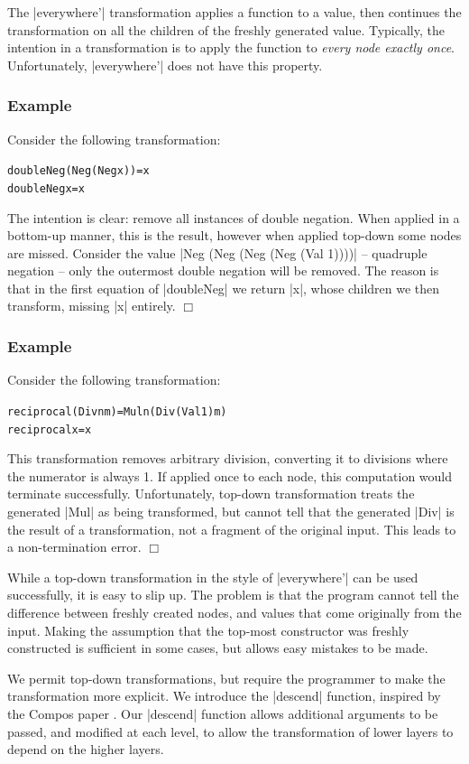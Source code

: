 \documentclass[preprint]{sigplanconf}
\let\cite=\citep
\newcounter{exmp}
\newcommand{\yesexample}{\subsubsection*{Example \arabic{exmp}}\refstepcounter{exmp}}
\newcommand{\noexample}{\hfill$\Box$}
\newenvironment{code}{\begin{alltt}\small}{\end{alltt}}
\newenvironment{example}{\yesexample}{\noexample}
\begin{document}
The |everywhere'| transformation applies a function to a value, then continues the transformation on all the children of the freshly generated value. Typically, the intention in a transformation is to apply the function to \textit{every node exactly once}. Unfortunately, |everywhere'| does not have this property.

\begin{example}
Consider the following transformation:

\begin{code}
doubleNeg (Neg (Neg x))  = x
doubleNeg x              = x
\end{code}

The intention is clear: remove all instances of double negation. When applied in a bottom-up manner, this is the result, however when applied top-down some nodes are missed. Consider the value |Neg (Neg (Neg (Neg (Val 1))))| -- quadruple negation -- only the outermost double negation will be removed. The reason is that in the first equation of |doubleNeg| we return |x|, whose children we then transform, missing |x| entirely.
\end{example}

\begin{example}
Consider the following transformation:

\begin{code}
reciprocal (Div n m)  = Mul n (Div (Val 1) m)
reciprocal x          = x
\end{code}

This transformation removes arbitrary division, converting it to divisions where the numerator is always 1. If applied once to each node, this computation would terminate successfully. Unfortunately, top-down transformation treats the generated |Mul| as  being transformed, but cannot tell that the generated |Div| is the result of a transformation, not a fragment of the original input. This leads to a non-termination error.
\end{example}

While a top-down transformation in the style of |everywhere'| can be used successfully, it is easy to slip up. The problem is that the program cannot tell the difference between freshly created nodes, and values that come originally from the input. Making the assumption that the top-most constructor was freshly constructed is sufficient in some cases, but allows easy mistakes to be made.

We permit top-down transformations, but require the programmer to make the transformation more explicit. We introduce the |descend| function, inspired by the Compos paper \cite{bringert:compos}. Our |descend| function allows additional arguments to be passed, and modified at each level, to allow the transformation of lower layers to depend on the higher layers.
\end{document}
